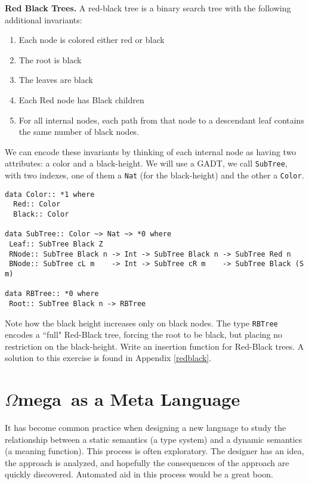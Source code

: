 \documentclass[11pt,twoside,A4]{llncs}
\newcommand{\om}{\emph{$\Omega$}mega}
\begin{document}
\begin{exercise}

{\bf Red Black Trees.}
A red-black tree is a binary search tree with the following additional invariants:

\begin{enumerate}
\item Each node is colored either red or black
\item The root is black
\item The leaves are black
\item Each Red node has Black children \label{RedKidsAreBlack}
\item For all internal nodes, each path from that node to a descendant 
        leaf contains the same number of black nodes.
\end{enumerate}

We can encode these invariants by thinking of each internal node as having two
attributes: a color and a black-height. We will use a GADT, we call {\tt SubTree},
with two indexes, one of them a {\tt Nat} (for the black-height) and the other a
{\tt Color}.

{\small
\begin{verbatim}
data Color:: *1 where 
  Red:: Color
  Black:: Color

data SubTree:: Color ~> Nat ~> *0 where 
 Leaf:: SubTree Black Z
 RNode:: SubTree Black n -> Int -> SubTree Black n -> SubTree Red n
 BNode:: SubTree cL m    -> Int -> SubTree cR m    -> SubTree Black (S m)

data RBTree:: *0 where
 Root:: SubTree Black n -> RBTree
\end{verbatim}}
\noindent
Note how the black height increases only on black nodes. The type
{\tt RBTree} encodes a ``full" Red-Black tree, forcing the root
to be black, but placing no restriction on the black-height.
Write an insertion function for Red-Black trees.
A solution to this exercise is found in Appendix \ref{redblack}.
\end{exercise}

\section{\om\ as a Meta Language}

It has become common practice when designing a new language to study the
relationship between a static semantics (a type system) and a dynamic
semantics (a meaning function). This process is often exploratory. The
designer has an idea, the approach is analyzed, and hopefully the
consequences of the approach are quickly discovered. Automated aid in this
process would be a great boon.
\end{document}
